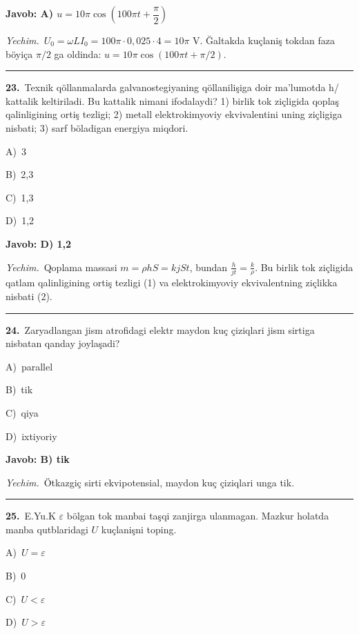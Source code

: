 \documentclass[11pt,a4paper]{article}
\newcommand{\opt}[2]{\hspace*{4mm}#1)\ #2\par}
\begin{document}
\noindent\colorbox{gray!12}{\parbox{\dimexpr\linewidth-2\fboxsep}{\textbf{Javob: A) $u = 10\pi\cos(100\pi t + \dfrac{\pi}{2})$}}}\par\smallskip
\noindent\textit{Yechim.}\ $U_0=\omega LI_0=100\pi\cdot0{,}025\cdot4=10\pi$ V. Ğaltakda kuçlaniş tokdan faza böyiça $\pi/2$ ga oldinda: $u=10\pi\cos(100\pi t+\pi/2)$.\par\par\medskip\hrule\medskip
{}\noindent\begin{minipage}{\linewidth}
\textbf{23.}\ Texnik qöllanmalarda galvanostegiyaning qöllanilişiga doir ma’lumotda h/ kattalik keltiriladi. Bu kattalik nimani ifodalaydi? 1) birlik tok ziçligida qoplaş qalinligining ortiş tezligi; 2) metall elektrokimyoviy ekvivalentini uning ziçligiga nisbati; 3) sarf böladigan energiya miqdori.\par\smallskip
\opt{A}{3}
\opt{B}{2,3}
\opt{C}{1,3}
\opt{D}{1,2}
\end{minipage}\vspace{2pt}\par
\noindent\colorbox{gray!12}{\parbox{\dimexpr\linewidth-2\fboxsep}{\textbf{Javob: D) 1,2}}}\par\smallskip
\noindent\textit{Yechim.}\ Qoplama massasi $m=\rho hS=kjSt$, bundan $\frac{h}{jt}=\frac{k}{\rho}$. Bu birlik tok ziçligida qatlam qalinligining ortiş tezligi (1) va elektrokimyoviy ekvivalentning ziçlikka nisbati (2).\par\par\medskip\hrule\medskip
{}\noindent\begin{minipage}{\linewidth}
\textbf{24.}\ Zaryadlangan jism atrofidagi elektr maydon kuç çiziqlari jism sirtiga nisbatan qanday joylaşadi?\par\smallskip
\opt{A}{parallel}
\opt{B}{tik}
\opt{C}{qiya}
\opt{D}{ixtiyoriy}
\end{minipage}\vspace{2pt}\par
\noindent\colorbox{gray!12}{\parbox{\dimexpr\linewidth-2\fboxsep}{\textbf{Javob: B) tik}}}\par\smallskip
\noindent\textit{Yechim.}\ Ötkazgiç sirti ekvipotensial, maydon kuç çiziqlari unga tik.\par\par\medskip\hrule\medskip
{}\noindent\begin{minipage}{\linewidth}
\textbf{25.}\ E.Yu.K $\varepsilon$ bölgan tok manbai taşqi zanjirga ulanmagan. Mazkur holatda manba qutblaridagi $U$ kuçlanişni toping.\par\smallskip
\opt{A}{$U=\varepsilon$}
\opt{B}{0}
\opt{C}{$U<\varepsilon$}
\opt{D}{$U>\varepsilon$}
\end{minipage}\vspace{2pt}\par
\end{document}
